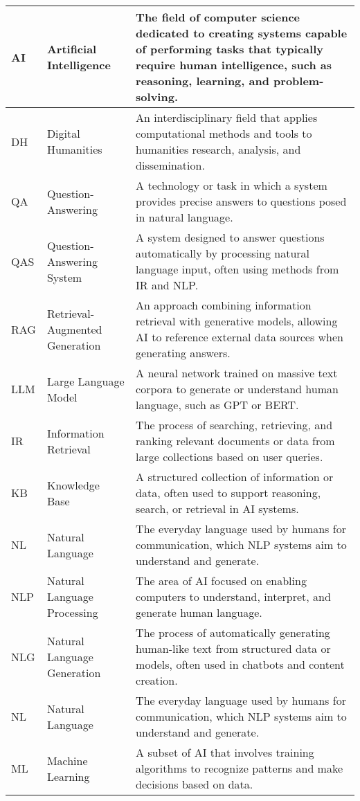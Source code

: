 \begin{tabularx}{\textwidth}{
  >{\raggedright\arraybackslash}p{2.5cm}
  >{\raggedright\arraybackslash}p{4cm}
  >{\noindent\justifying\arraybackslash}X
}
AI    & Artificial Intelligence & The field of computer science dedicated to creating systems capable of performing tasks that typically require human intelligence, such as reasoning, learning, and problem-solving. \\
\cmidrule(lr){1-3}
DH    & Digital Humanities & An interdisciplinary field that applies computational methods and tools to humanities research, analysis, and dissemination. \\
\cmidrule(lr){1-3}
QA    & Question-Answering & A technology or task in which a system provides precise answers to questions posed in natural language. \\
\cmidrule(lr){1-3}
QAS   & Question-Answering System & A system designed to answer questions automatically by processing natural language input, often using methods from IR and NLP. \\
\cmidrule(lr){1-3}
RAG   & Retrieval-Augmented Generation & An approach combining information retrieval with generative models, allowing AI to reference external data sources when generating answers. \\
\cmidrule(lr){1-3}
LLM   & Large Language Model & A neural network trained on massive text corpora to generate or understand human language, such as GPT or BERT. \\
\cmidrule(lr){1-3}
IR    & Information Retrieval & The process of searching, retrieving, and ranking relevant documents or data from large collections based on user queries. \\
\cmidrule(lr){1-3}
KB    & Knowledge Base & A structured collection of information or data, often used to support reasoning, search, or retrieval in AI systems. \\
\cmidrule(lr){1-3}
NL & Natural Language & The everyday language used by humans for communication, which NLP systems aim to understand and generate. \\
\cmidrule(lr){1-3}
NLP   & Natural Language Processing & The area of AI focused on enabling computers to understand, interpret, and generate human language. \\
\cmidrule(lr){1-3}
NLG   & Natural Language Generation & The process of automatically generating human-like text from structured data or models, often used in chatbots and content creation. \\
\cmidrule(lr){1-3}
NL & Natural Language & The everyday language used by humans for communication, which NLP systems aim to understand and generate. \\
\cmidrule(lr){1-3}
ML    & Machine Learning & A subset of AI that involves training algorithms to recognize patterns and make decisions based on data. \\

\end{tabularx}
